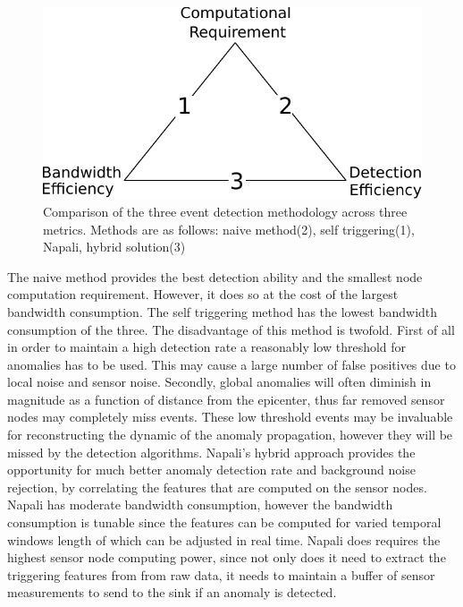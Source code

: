 \begin{figure}[h]
	  \centering
	  \includegraphics[width=0.5\linewidth]{img/edge_computing_vs.pdf}
	\caption{Comparison of the three event detection methodology across three metrics. Methods are as follows: naive method(2), self triggering(1), Napali, hybrid solution(3)}
	\label{intro:fig:edge}
\end{figure}
The naive method provides the best detection ability and the smallest node computation requirement. However, it does so at the cost of the largest bandwidth consumption. The self triggering method has the lowest bandwidth consumption of the three. The disadvantage of this method is twofold. First of all in order to maintain a high detection rate a reasonably low threshold for anomalies has to be used. This may cause a large number of false positives due to local noise and sensor noise. Secondly, global anomalies will often diminish in magnitude as a function of distance from the epicenter, thus far removed sensor nodes may completely miss events. These low threshold events may be invaluable for reconstructing the dynamic of the anomaly propagation, however they will be missed by the detection algorithms. Napali's hybrid approach provides the opportunity for much better anomaly detection rate and background noise rejection, by correlating the features that are computed on the sensor nodes. Napali has moderate bandwidth consumption, however the bandwidth consumption is tunable since the features can be computed for varied temporal windows length of which can be adjusted in real time. Napali does requires the highest sensor node computing power, since not only does it need to extract the triggering features from from raw data, it needs to maintain a buffer of sensor measurements to send to the sink if an anomaly is detected.

